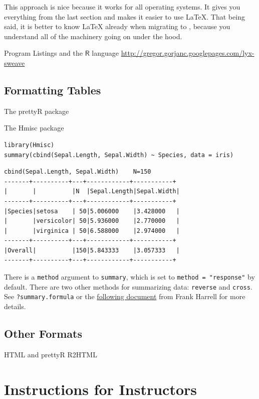 \documentclass[captions=tableheading]{scrbook}
\begin{document}
\begin{example}
This approach is nice because it works for all operating  systems. It gives you everything from the last section and makes it easier to use \LaTeX{}. That being said, it is better to know \LaTeX{} already when migrating to \LyX{}, because you understand all of the machinery going on under the hood.

Program Listings and the \(\mathsf{R}\) language
\href{http://gregor.gorjanc.googlepages.com/lyx-sweave}{http://gregor.gorjanc.googlepages.com/lyx-sweave}
\section{Formatting Tables}
\label{sec-22-3}
\label{sec-Formatting-Tables}


The prettyR package 

The Hmisc package


\lstset{language=R}
\begin{lstlisting}
library(Hmisc)
summary(cbind(Sepal.Length, Sepal.Width) ~ Species, data = iris)
\end{lstlisting}


\begin{verbatim}
cbind(Sepal.Length, Sepal.Width)    N=150
-------+----------+---+------------+-----------+
|       |          |N  |Sepal.Length|Sepal.Width|
-------+----------+---+------------+-----------+
|Species|setosa    | 50|5.006000    |3.428000   |
|       |versicolor| 50|5.936000    |2.770000   |
|       |virginica | 50|6.588000    |2.974000   |
-------+----------+---+------------+-----------+
|Overall|          |150|5.843333    |3.057333   |
-------+----------+---+------------+-----------+
\end{verbatim}

There is a \texttt{method} argument to \texttt{summary}, which is set to \texttt{method = "response"} by default. There are two other methods for summarizing data: \texttt{reverse} and \texttt{cross}. See \texttt{?summary.formula} or the \href{http://biostat.mc.vanderbilt.edu/twiki/bin/view/Main/StatReport}{following document} from Frank Harrell for more details.
\section{Other Formats}
\label{sec-22-4}
\label{sec-Other-Formats}


HTML and prettyR
R2HTML
\chapter{Instructions for Instructors}
\label{sec-23}
\label{cha-Instructions-for-Instructors}



\end{example}
\end{document}
